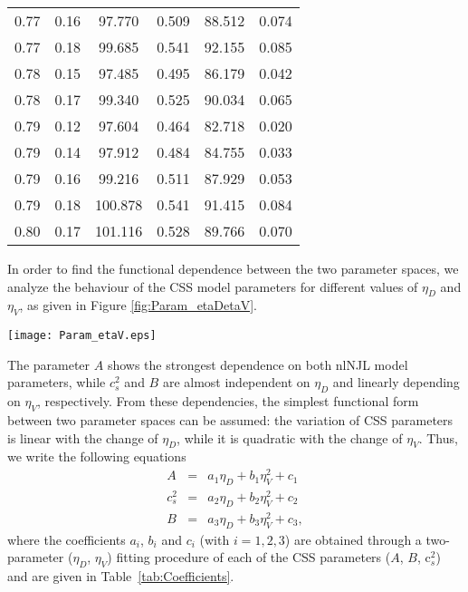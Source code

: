 \documentclass[%
 reprint,
superscriptaddress,
nofootinbib,
 amsmath,amssymb,
 aps,
]{revtex4-1}
\begin{document}
\begin{table} [t]
\begin{ruledtabular}
\begin{tabular}{lccccc}
0.77&	0.16&	97.770&	0.509&	88.512&	0.074\\
0.77&	0.18&	99.685&	0.541&	92.155&	0.085\\
0.78&	0.15&	97.485&	0.495&	86.179&	0.042\\
0.78&	0.17&	99.340&	0.525&	90.034&	0.065\\
0.79&	0.12&	97.604&	0.464&	82.718&	0.020\\
0.79&	0.14&	97.912&	0.484&	84.755&	0.033\\
0.79&	0.16&	99.216&	0.511&	87.929&	0.053\\
0.79&	0.18&	100.878&0.541&	91.415&	0.084\\
0.80&	0.17&	101.116&0.528&	89.766&	0.070
\end{tabular}
\end{ruledtabular}
\end{table}

In order to find the functional dependence between the two parameter spaces, we analyze the behaviour of the CSS model parameters for different values of $\eta_D$ and $\eta_V$, as given in Figure \ref{fig:Param_etaDetaV}. 
\begin{figure*}[t!]
    \centering
     \texttt{[image: Param\_etaV.eps]}
    \caption{The change of CSS parameters ($A$, $c_s^2$ and $B$) with the increase of $\eta_D$ for different values of $\eta_V$ (from 0.12 to 0.18 in steps of 0.01) on the left panels, and with the increase of $\eta_V$ for different values of $\eta_D$ (from 0.71 to 0.78 in steps of 0.01) on the right panels.}
    \label{fig:Param_etaDetaV}
\end{figure*}
The parameter $A$ shows the strongest dependence on both nlNJL model parameters, while $c_s^2$ and $B$ are almost independent on $\eta_D$ and linearly depending on $\eta_V$, respectively. From these dependencies, the simplest functional form between two parameter spaces can be assumed: the variation of CSS parameters is linear with the change of $\eta_D$, while it is quadratic with the change of $\eta_V$. Thus, we write the following equations
\begin{eqnarray}
\label{eq:A}
    A &=& a_1 \eta_D + b_1 \eta_V^2 + c_1 \\
\label{eq:cs2}
    c_s^2 &=& a_2 \eta_D + b_2 \eta_V^2 + c_2\\
    B &=& a_3 \eta_D + b_3 \eta_V^2 + c_3 ,
\label{eq:B}
\end{eqnarray}
where the coefficients $a_i$, $b_i$ and $c_i$ (with $i = 1, 2, 3$) are obtained 
through a two-parameter ($\eta_D$, $\eta_V$) fitting procedure of each of the CSS parameters ($A$, $B$, c$_s^2$) and are given in Table~\ref{tab:Coefficients}.
\end{document}
